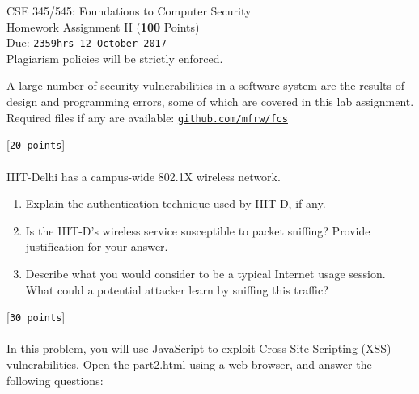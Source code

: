 \documentclass[11pt]{article}
\begin{document}
\begin{center}
\LARGE CSE 345/545: Foundations to Computer Security \\
\Large Homework Assignment II (\textbf{100} Points) \\
\Large Due: \texttt{2359hrs 12 October 2017} \\
Plagiarism policies will be strictly enforced. \\
\end{center}

\noindent A large number of security vulnerabilities in a software system are the results of design and programming errors, some of which are covered in this lab assignment.\\
Required files if any are available: \href{https://www.github.com/mfrw/fcs/}{\texttt{github.com/mfrw/fcs\\}}

 [\texttt{20 points}] \\\\
IIIT-Delhi has a campus-wide 802.1X wireless network.
\begin{enumerate}
\item Explain the  authentication technique used by IIIT-D, if any.
\item Is the IIIT-D’s wireless service susceptible to packet sniffing? Provide justification for your answer.
\item Describe what you would consider to be a typical Internet usage session. What could a potential attacker learn by sniffing this traffic?
\end{enumerate}

 [\texttt{30 points}] \\\\
In this problem, you will use JavaScript to exploit Cross-Site Scripting (XSS) vulnerabilities. Open the part2.html using a web browser, and answer the following questions:
\end{document}
